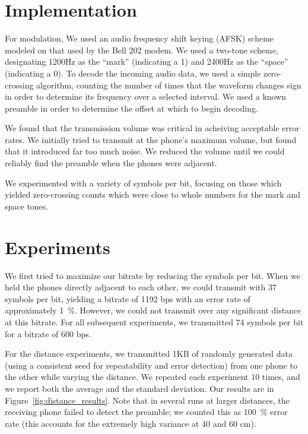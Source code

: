 \documentclass{article}
\title{\class} \author{\us}
\begin{document}
\maketitle

\section{Implementation}
For modulation, We used an audio frequency shift keying (AFSK) scheme
modeled on that used by the Bell 202 modem. We used a two-tone scheme,
designating 1200Hz as the ``mark'' (indicating a 1) and 2400Hz as the
``space'' (indicating a 0). To decode the incoming audio data, we used
a simple zero-crossing algorithm, counting the number of times that
the waveform changes sign in order to determine its frequency over a
selected interval. We used a known preamble in order to determine the
offset at which to begin decoding.

We found that the transmission volume was critical in acheiving
acceptable error rates. We initially tried to transmit at the phone's
maximum volume, but found that it introduced far too much noise. We
reduced the volume until we could reliably find the preamble when the
phones were adjacent.

We experimented with a variety of symbols per bit, focusing on those
which yielded zero-crossing counts which were close to whole numbers
for the mark and space tones.

\section{Experiments}
We first tried to maximize our bitrate by reducing the symbols per
bit. When we held the phones directly adjacent to each other, we could
transmit with 37 symbols per bit, yielding a bitrate of 1192 bps with
an error rate of approximately 1~\%. However, we could not transmit
over any significant distance at this bitrate. For all subsequent
experiments, we transmitted 74 symbols per bit for a bitrate of 600
bps.

For the distance experiments, we transmitted 1KB of randomly generated
data (using a consistent seed for repeatability and error detection)
from one phone to the other while varying the distance. We repeated
each experiment 10 times, and we report both the average and the
standard deviation. Our results are in
Figure~\ref{fig:distance_results}. Note that in several runs at larger
distances, the receiving phone failed to detect the preamble; we
counted this as 100~\% error rate (this accounts for the extremely
high variance at 40 and 60 cm).
\end{document}
